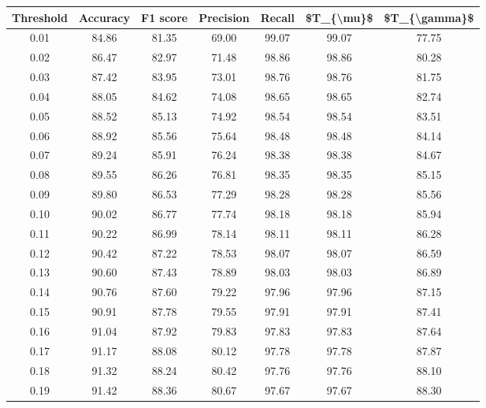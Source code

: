 \begin{tabular}{|c|c|c|c|c|c|c|}
\hline
 Threshold &  Accuracy &  F1 score &  Precision &  Recall &  \$T\_\{\textbackslash mu\}\$ &  \$T\_\{\textbackslash gamma\}\$ \\
\hline
      0.01 &     84.86 &     81.35 &      69.00 &   99.07 &      99.07 &         77.75 \\
      0.02 &     86.47 &     82.97 &      71.48 &   98.86 &      98.86 &         80.28 \\
      0.03 &     87.42 &     83.95 &      73.01 &   98.76 &      98.76 &         81.75 \\
      0.04 &     88.05 &     84.62 &      74.08 &   98.65 &      98.65 &         82.74 \\
      0.05 &     88.52 &     85.13 &      74.92 &   98.54 &      98.54 &         83.51 \\
      0.06 &     88.92 &     85.56 &      75.64 &   98.48 &      98.48 &         84.14 \\
      0.07 &     89.24 &     85.91 &      76.24 &   98.38 &      98.38 &         84.67 \\
      0.08 &     89.55 &     86.26 &      76.81 &   98.35 &      98.35 &         85.15 \\
      0.09 &     89.80 &     86.53 &      77.29 &   98.28 &      98.28 &         85.56 \\
      0.10 &     90.02 &     86.77 &      77.74 &   98.18 &      98.18 &         85.94 \\
      0.11 &     90.22 &     86.99 &      78.14 &   98.11 &      98.11 &         86.28 \\
      0.12 &     90.42 &     87.22 &      78.53 &   98.07 &      98.07 &         86.59 \\
      0.13 &     90.60 &     87.43 &      78.89 &   98.03 &      98.03 &         86.89 \\
      0.14 &     90.76 &     87.60 &      79.22 &   97.96 &      97.96 &         87.15 \\
      0.15 &     90.91 &     87.78 &      79.55 &   97.91 &      97.91 &         87.41 \\
      0.16 &     91.04 &     87.92 &      79.83 &   97.83 &      97.83 &         87.64 \\
      0.17 &     91.17 &     88.08 &      80.12 &   97.78 &      97.78 &         87.87 \\
      0.18 &     91.32 &     88.24 &      80.42 &   97.76 &      97.76 &         88.10 \\
      0.19 &     91.42 &     88.36 &      80.67 &   97.67 &      97.67 &         88.30 \\

\end{tabular}
